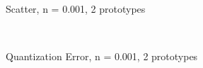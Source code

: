 \documentclass[10pt,a4paper]{article}
\begin{document}
\begin{figure}
  \centering
{} \\
  \caption{Scatter, n = 0.001, 2 prototypes}
  \label{fig:n0001_k2}
\end{figure}

\begin{figure}
  \centering
{} \\
  \caption{Quantization Error, n = 0.001, 2 prototypes}
  \label{fig:n0001_k2_learning}
\end{figure}
\end{document}
